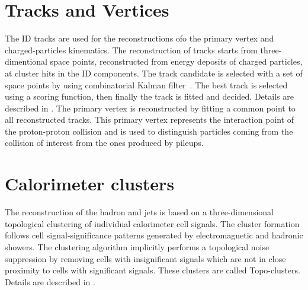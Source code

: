 \section{Tracks and Vertices}
The ID tracks are used for the reconstructions ofo the primary vertex and charged-particles kinematics.
The reconstruction of tracks starts from three-dimentional space points, 
reconstructed from energy deposits of charged particles, at cluster hits in the ID components. 
The track candidate is selected with a set of space points by using combinatorial Kalman filter~\cite{FRUHWIRTH1987444}. 
The best track is selected using a scoring function, then finally the track is fitted and decided. Details are described in \cite{PERF-2015-08}.
The primary vertex is reconstructed by fitting a common point to all reconstructed tracks. 
This primary vertex represents the interaction point of the proton-proton collision and is used to distinguish particles coming from the collision of interest from the ones produced by pileups.
\section{Calorimeter clusters} 
The reconstruction of the hadron and jets is based on a three-dimensional topological clustering of individual calorimeter cell signals.
The cluster formation follows cell signal-significance patterns generated by electromagnetic and hadronic showers. The clustering algorithm implicitly performs a topological noise suppression by removing cells with insignificant signals which are not in close proximity to cells with significant signals. These clusters are called Topo-clusters. Details are described in \cite{PERF-2014-07}.
